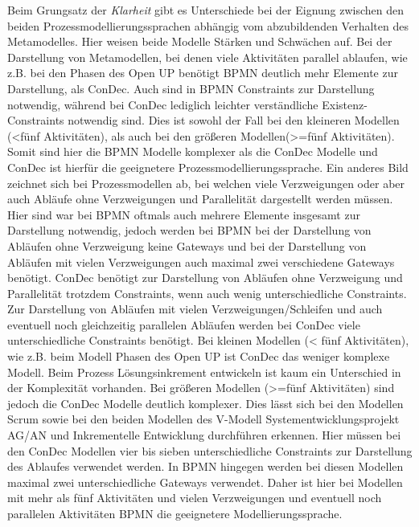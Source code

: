 Beim Grungsatz der \textit{Klarheit} gibt es Unterschiede bei der Eignung zwischen den beiden Prozessmodellierungssprachen abhängig vom abzubildenden Verhalten des Metamodelles. Hier weisen beide Modelle Stärken und Schwächen auf. \newline
Bei der Darstellung von Metamodellen, bei denen viele Aktivitäten parallel ablaufen, wie z.B. bei den Phasen des Open UP benötigt BPMN deutlich mehr Elemente zur Darstellung, als ConDec. Auch sind in BPMN Constraints zur Darstellung notwendig, während bei ConDec lediglich leichter verständliche Existenz-Constraints notwendig sind. Dies ist sowohl der Fall bei den kleineren Modellen (<fünf Aktivitäten), als auch bei den größeren Modellen(>=fünf Aktivitäten). Somit sind hier die BPMN Modelle komplexer als die ConDec Modelle und ConDec ist hierfür die geeignetere Prozessmodellierungssprache. \newline
Ein anderes Bild zeichnet sich bei Prozessmodellen ab, bei welchen viele Verzweigungen oder aber auch Abläufe ohne Verzweigungen und Parallelität dargestellt werden müssen. Hier sind war bei BPMN oftmals auch mehrere Elemente insgesamt zur Darstellung notwendig, jedoch werden bei BPMN bei der Darstellung von Abläufen ohne Verzweigung keine Gateways und bei der Darstellung von Abläufen mit vielen Verzweigungen auch maximal zwei verschiedene Gateways benötigt. ConDec benötigt zur Darstellung von Abläufen ohne Verzweigung und Parallelität trotzdem Constraints, wenn auch wenig unterschiedliche Constraints. Zur Darstellung von Abläufen mit vielen Verzweigungen/Schleifen und auch eventuell noch gleichzeitig parallelen Abläufen werden bei ConDec viele unterschiedliche Constraints benötigt. Bei kleinen Modellen (< fünf Aktivitäten), wie z.B. beim Modell Phasen des Open UP ist ConDec das weniger komplexe Modell. Beim Prozess Lösungsinkrement entwickeln ist kaum ein Unterschied in der Komplexität vorhanden. Bei größeren Modellen (>=fünf Aktivitäten) sind jedoch die ConDec Modelle deutlich komplexer. Dies lässt sich bei den Modellen Scrum sowie bei den beiden Modellen des V-Modell Systementwicklungsprojekt AG/AN und Inkrementelle Entwicklung durchführen erkennen. Hier müssen bei den ConDec Modellen vier bis sieben unterschiedliche Constraints zur Darstellung des Ablaufes verwendet werden. In BPMN hingegen werden bei diesen Modellen maximal zwei unterschiedliche Gateways verwendet. Daher ist hier bei Modellen mit mehr als fünf Aktivitäten und vielen Verzweigungen und eventuell noch parallelen Aktivitäten BPMN die geeignetere Modellierungssprache.\newline

